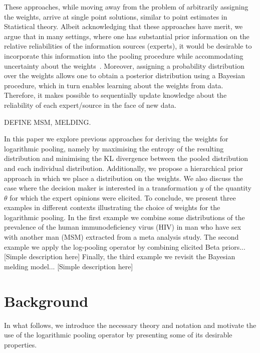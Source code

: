 \documentclass[a4paper, notitlepage, 10pt]{article}
\begin{document}
These approaches, while moving away from the problem of arbitrarily assigning the weights, arrive at single point solutions, similar to point estimates in Statistical theory.
Albeit acknowledging that these approaches have merit, we argue that in many settings, where one has substantial prior information on the relative reliabilities of the information sources (experts), it would be desirable to incorporate this information into the pooling procedure while accommodating uncertainty about the weights~\citep{poole2000}.
Moreover, assigning a probability distribution over the weights allows one to obtain a posterior distribution using a Bayesian procedure, which in turn enables learning about the weights from data.
Therefore, it makes possible to sequentially update knowledge about the reliability of each expert/source in the face of new data.


DEFINE MSM, MELDING. 


In this paper we explore previous approaches for deriving the weights for logarithmic pooling, namely by maximising the entropy of the resulting distribution and minimising the KL divergence between the pooled distribution and each individual distribution.
Additionally, we propose a hierarchical prior approach in which we place a distribution on the weights.
We also discuss the case where the decision maker is interested in a transformation $y$ of the quantity $\theta$ for which the expert opinions were elicited.
To conclude, we present three examples in different contexts illustrating the choice of weights for the logarithmic pooling. %
In the first example we combine some distributions of the prevalence of the human immunodeficiency virus (HIV) in man who have sex with another man (MSM) extracted from a meta analysis study.
The second example we apply the log-pooling operator by combining elicited Beta priors... [Simple description here]
Finally, the third example we revisit the Bayesian melding model... [Simple description here]

\section*{Background}


In what follows, we introduce the necessary theory and notation and motivate the use of the logarithmic pooling operator by presenting some of its desirable properties.
\end{document}

